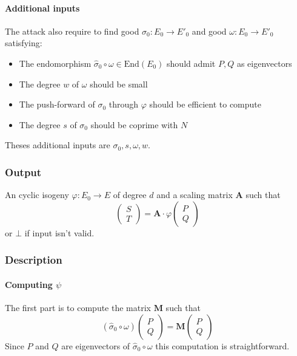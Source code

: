 \documentclass[12pt,a4paper]{article}
\begin{document}
		\paragraph{Additional inputs}
		The attack also require to find good $\sigma_0:E_0\to E'_0$ and good $\omega:E_0\to E'_0$ satisfying:
		\begin{itemize}
			\item The endomorphism $\widehat\sigma_0\circ\omega\in\mathrm{End}(E_0)$
				should admit $P,Q$ as eigenvectors
			\item The degree $w$ of $\omega$ should be small
			\item The push-forward of $\sigma_0$ through $\varphi$ should be efficient to compute
			\item The degree $s$ of $\sigma_0$ should be coprime with $N$
		\end{itemize}
		Theses additional inputs are $\sigma_0,s,\omega,w$.

		\subsubsection{Output}
		An cyclic isogeny $\varphi:E_0\to E$ of degree $d$ and a scaling matrix $\mathbf A$ such that
		\[
			\begin{pmatrix} S \\ T \end{pmatrix} = \mathbf A\cdot\varphi\begin{pmatrix} P \\ Q \end{pmatrix} 
		\] 
		or $\bot$ if input isn't valid.


		\subsubsection{Description}

		\paragraph{Computing $\psi$}

		The first part is to compute the matrix $\mathbf M$ such that \[
			(\widehat\sigma_0\circ \omega) \begin{pmatrix} P \\
				Q \end{pmatrix} = \mathbf M \begin{pmatrix} P \\ Q \end{pmatrix} \] 
				Since $P$ and $Q$ are eigenvectors of $\widehat\sigma_0\circ\omega$ this computation is
				straightforward.
\end{document}
